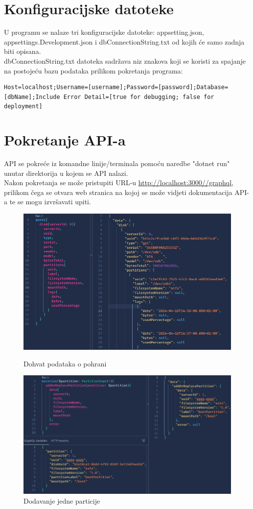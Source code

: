 \documentclass[zavrsnirad]{fer}
\begin{document}
\section{Konfiguracijske datoteke}
U programu se nalaze tri konfiguracijske datoteke: appsetting.json, appsettings.Development.json i dbConnectionString.txt od kojih će samo zadnja biti opisana.
\\dbConnectionString.txt datoteka sadržava niz znakova koji se koristi za spajanje na postojeću bazu podataka prilikom pokretanja programa:
\begin{lstlisting}[title=dbConnectionString.txt]
	Host=localhost;Username=[username];Password=[password];Database=[dbName];Include Error Detail=[true for debugging; false for deployment]
\end{lstlisting}

\section{Pokretanje API-a}
API se pokreće iz komandne linije/terminala pomoću naredbe "dotnet run" unutar direktorija u kojem se API nalazi.
\\Nakon pokretanja se može pristupiti URL-u \url{http://localhost:3000//graphql}, prilikom čega se otvara web stranica na kojoj se može vidjeti dokumentacija API-a te se mogu izvršavati upiti.
\begin{figure}[htb!]
	\centering
	\includegraphics[width=1\linewidth]{images/api_query.png} 
	\caption{Dohvat podataka o pohrani}
	\label{slk:api_query}
	\includegraphics[width=1\linewidth]{images/api_mutation.png} 
	\caption{Dodavanje jedne particije}
	\label{slk:api_mutation}
\end{figure}
\end{document}
